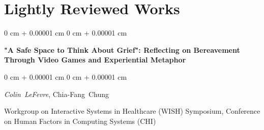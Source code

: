 \documentclass[10pt, letterpaper]{article}
\newenvironment{onecolentry}{
    \begin{adjustwidth}{
        0 cm + 0.00001 cm
    }{
        0 cm + 0.00001 cm
    }
}{
    \end{adjustwidth}
} %
\newenvironment{twocolentry}[2][]{
    \onecolentry
    \def\secondColumn{#2}
    \setcolumnwidth{\fill, 4.5 cm}
    \begin{paracol}{2}
}{
    \switchcolumn \raggedleft \secondColumn
    \end{paracol}
    \endonecolentry
} %
\begin{document}
    
    \section{Lightly Reviewed Works}



        
        \begin{samepage}
            \begin{twocolentry}{
                2023
            }
                \textbf{"A Safe Space to Think About Grief": Reflecting on Bereavement Through Video Games and Experiential Metaphor}
            \end{twocolentry}

            \vspace{0.10 cm}
            
            \begin{onecolentry}
                \mbox{\textit{Colin LeFevre}}, \mbox{Chia-Fang Chung}

                \vspace{0.10 cm}
                
        Workgroup on Interactive Systems in Healthcare (WISH) Symposium, Conference on Human Factors in Computing Systems (CHI)\end{onecolentry}
        \end{samepage}


    
\end{document}
